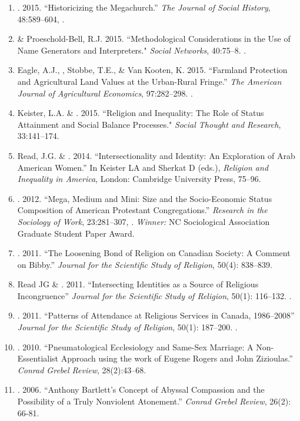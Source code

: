 \begin{enumerate}
\item \Tian. 2015. ``Historicizing the Megachurch.'' \textit{The Journal of Social History}, 48:589--604, .

\item \Tian \& Proeschold-Bell, R.J. 2015. ``Methodological Considerations in the Use of Name Generators and Interpreters." \emph{Social Networks}, 40:75--8. .

\item Eagle, A.J., \Tian, Stobbe, T.E., \& Van Kooten, K. 2015. ``Farmland Protection and Agricultural Land Values at the Urban-Rural Fringe.'' \emph{The American Journal of Agricultural Economics}, 97:282--298. .

\item Keister, L.A. \& \Tian. 2015. ``Religion and Inequality: The Role of Status Attainment and Social Balance Processes." \emph{Social Thought and Research}, 33:141--174. 

\item Read, J.G. \& \Tian. 2014. ``Intersectionality and Identity: An Exploration of Arab American Women.'' In Keister LA and Sherkat D (eds.), \emph{Religion and Inequality in America}, London: Cambridge University Press, 75--96.

\item \Tian. 2012. ``Mega, Medium and Mini: Size and the Socio-Economic Status Composition of American Protestant Congregations.'' \emph{Research in the Sociology of Work}, 23:281--307, . \emph{Winner:} NC Sociological Association Graduate Student Paper Award.

\item \Tian. 2011. ``The Loosening Bond of Religion on Canadian Society: A Comment on Bibby.'' \emph{Journal for the Scientific Study of Religion}, 50(4): 838--839.

\item Read JG \& \Tian. 2011. ``Intersecting Identities as a Source of Religious Incongruence''  \emph{Journal for the Scientific Study of Religion}, 50(1): 116--132. .

\item \Tian. 2011. ``Patterns of Attendance at Religious Services in Canada, 1986--2008'' \emph{Journal for the Scientific Study of Religion}, 50(1): 187--200. .

\item \Tian. 2010. ``Pneumatological Ecclesiology and Same-Sex Marriage: A Non-Essentialist Approach using the work of Eugene Rogers and John Zizioulas.'' \emph{Conrad Grebel Review}, 28(2):43--68.

\item \Tian. 2006. ``Anthony Bartlett's Concept of Abyssal Compassion and the Possibility of a Truly Nonviolent Atonement.'' \emph{Conrad Grebel Review}, 26(2): 66-81.	

\end{enumerate}

